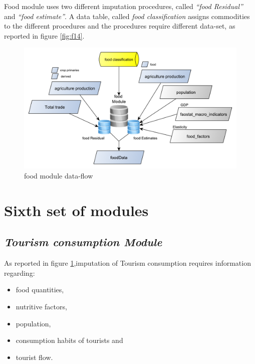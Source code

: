 \documentclass[]{article}
\providecommand{\tightlist}{%
  \setlength{\itemsep}{0pt}\setlength{\parskip}{0pt}}
\begin{document}
Food module uses two different imputation procedures, called
\emph{``food Residual''} and \emph{``food estimate''}. A data table,
called \emph{food classification} assigns commodities to the different
procedures and the procedures require different data-set, as reported in
figure \ref{fig:f14}.

\begin{figure}[H]

{\centering \includegraphics[width=0.8\linewidth]{images/SwsFbs/15_food} 

}

\caption{\label{fig:f15}food module data-flow}\label{fig:f15}
\end{figure}

\section{Sixth set of modules}\label{sixth-set-of-modules}

\subsection{\texorpdfstring{\emph{Tourism consumption
Module}}{Tourism consumption Module}}\label{tourism-consumption-module}

As reported in figure \ref{fig:f15},imputation of Tourism consumption
requires information regarding:

\begin{itemize}
\tightlist
\item
  food quantities,
\item
  nutritive factors,
\item
  population,
\item
  consumption habits of tourists and
\item
  tourist flow.
\end{itemize}
\end{document}
